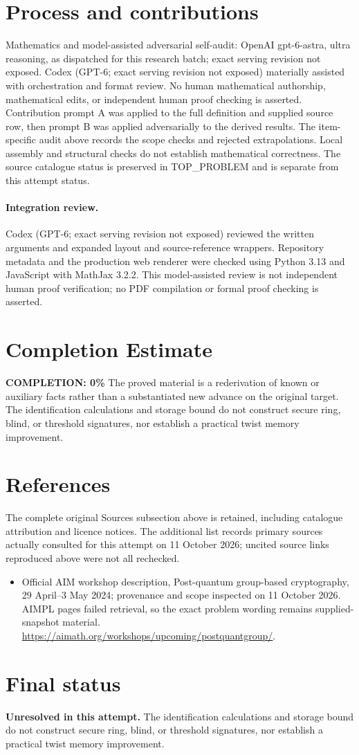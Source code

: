\documentclass[11pt]{article}
\begin{document}
\section{Process and contributions}
Mathematics and model-assisted adversarial self-audit: OpenAI gpt-6-astra, ultra reasoning, as dispatched for this research batch; exact serving revision not exposed. Codex (GPT-6; exact serving revision not exposed) materially assisted with orchestration and format review. No human mathematical authorship, mathematical edits, or independent human proof checking is asserted.
Contribution prompt A was applied to the full definition and supplied source row, then prompt B was applied adversarially to the derived results. The item-specific audit above records the scope checks and rejected extrapolations. Local assembly and structural checks do not establish mathematical correctness. The source catalogue status is preserved in TOP\_PROBLEM and is separate from this attempt status.
\paragraph{Integration review.} Codex (GPT-6; exact serving revision not exposed) reviewed the written arguments and expanded layout and source-reference wrappers. Repository metadata and the production web renderer were checked using Python 3.13 and JavaScript with MathJax 3.2.2. This model-assisted review is not independent human proof verification; no PDF compilation or formal proof checking is asserted.

\section{Completion Estimate}
\noindent\textbf{COMPLETION: 0\%}
The proved material is a rederivation of known or auxiliary facts rather than a substantiated new advance on the original target. The identification calculations and storage bound do not construct secure ring, blind, or threshold signatures, nor establish a practical twist memory improvement.
\section{References}
The complete original Sources subsection above is retained, including catalogue attribution and licence notices. The additional list records primary sources actually consulted for this attempt on 11 October 2026; uncited source links reproduced above were not all rechecked.
\begin{itemize}
\item Official AIM workshop description, Post-quantum group-based cryptography, 29 April--3 May 2024; provenance and scope inspected on 11 October 2026. AIMPL pages failed retrieval, so the exact problem wording remains supplied-snapshot material. \url{https://aimath.org/workshops/upcoming/postquantgroup/}.
\end{itemize}
\section{Final status}
\textbf{Unresolved in this attempt.} The identification calculations and storage bound do not construct secure ring, blind, or threshold signatures, nor establish a practical twist memory improvement.
\end{document}
